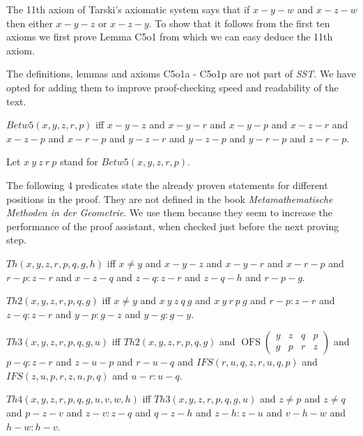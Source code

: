 \documentclass{article}
\newcommand{\OFS}[8]{\operatorname{OFS}
\left(\begin{smallmatrix}%
#1 & #2 & #3 & #4 \\
#5 & #6 & #7 & #8
\end{smallmatrix}\right)%
}
\begin{document}
  The 11th axiom of Tarski's axiomatic system says that if $x-y-w$ and $x-z-w$ then either $x-y-z$ or $x-z-y$. To show that it follows from the first ten axioms we first prove Lemma C5o1 from which we can easy deduce the 11th axiom.

  The definitions, lemmas and axioms C5o1a - C5o1p are not part of \textit{SST}. We have opted for adding them to improve proof-checking speed and readability of the text.

  \begin{forthel}
    \begin{definition}[C5o1a]
      $Betw5(x,y,z,r,p)$ iff $x-y-z$ and $x-y-r$ and $x-y-p$ and $x-z-r$ and $x-z-p$ and $x-r-p$ and $y-z-r$ and $y-z-p$ and $y-r-p$ and $z-r-p$.
    \end{definition}

    Let $x~y~z~r~p$ stand for $Betw5(x,y,z,r,p)$.
  \end{forthel}

  The following 4 predicates state the already proven statements for different positions in the proof.
  They are not defined in the book \textit{Metamathematische Methoden in der Geometrie}.
  We use them because they seem to increase the performance of the proof assistant,
  when checked just before the next proving step.

  \begin{forthel}
    \begin{definition}[C5o1b]
      $Th(x,y,z,r,p,q,g,h)$ iff $x \neq y$ and $x-y-z$ and $x-y-r$ and $x-r-p$ and $r-p : z-r$ and $x-z-q$ and $z-q : z-r$ and $z-q-h$ and $r-p-g$.
    \end{definition}

    \begin{definition}[C5o1c]
      $Th2(x,y,z,r,p,q,g)$ iff $x \neq y$ and $x~y~z~q~g$ and $x~y~r~p~g$ and $r-p : z-r$ and $z-q : z-r$ and $y-p : g-z$ and $y-g : g-y$.
    \end{definition}

    \begin{definition}[C5o1d]
      $Th3(x,y,z,r,p,q,g,u)$ iff $Th2(x,y,z,r,p,q,g)$ and $\OFS{y}{z}{q}{p}{g}{p}{r}{z}$ and $p-q : z-r$ and $z-u-p$ and $r-u-q$ and $IFS(r,u,q,z,r,u,q,p)$ and $IFS(z,u,p,r,z,u,p,q)$ and $u-r : u-q$.
    \end{definition}

    \begin{definition}[C5o1e]
      $Th4(x,y,z,r,p,q,g,u,v,w,h)$ iff $Th3(x,y,z,r,p,q,g,u)$ and $z \neq p$ and $z \neq q$ and $p-z-v$ and $z-v : z-q$ and $q-z-h$ and $z-h : z-u$ and $v-h-w$ and $h-w : h-v$.
    \end{definition}
  \end{forthel}
\end{document}
